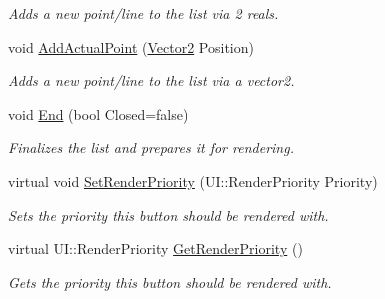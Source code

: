 \begin{DoxyCompactItemize}
\begin{DoxyCompactList}\small\item\em Adds a new point/line to the list via 2 reals. \item\end{DoxyCompactList}\item 
void \hyperlink{classphys_1_1UI_1_1LineList_ac7981508110779a12e3b80d0d57df755}{AddActualPoint} (\hyperlink{classphys_1_1Vector2}{Vector2} Position)
\begin{DoxyCompactList}\small\item\em Adds a new point/line to the list via a vector2. \item\end{DoxyCompactList}\item 
void \hyperlink{classphys_1_1UI_1_1LineList_a8ea40817665ec539b4ff97a64b73317f}{End} (bool Closed=false)
\begin{DoxyCompactList}\small\item\em Finalizes the list and prepares it for rendering. \item\end{DoxyCompactList}\item 
virtual void \hyperlink{classphys_1_1UI_1_1LineList_aa108c16282875850e5a6c01353977e97}{SetRenderPriority} (UI::RenderPriority Priority)
\begin{DoxyCompactList}\small\item\em Sets the priority this button should be rendered with. \item\end{DoxyCompactList}\item 
virtual UI::RenderPriority \hyperlink{classphys_1_1UI_1_1LineList_a95aa150344304a49d8f6c6024d6a5351}{GetRenderPriority} ()
\begin{DoxyCompactList}\small\item\em Gets the priority this button should be rendered with. \item\end{DoxyCompactList}\end{DoxyCompactItemize}
